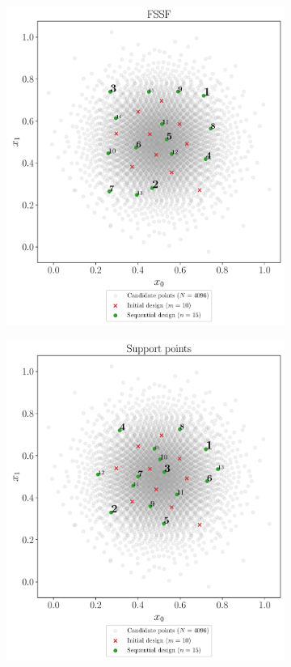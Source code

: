 \begin{figure}
  \centering
  \begin{subfigure}[b]{0.48\linewidth}
    \centering
    \includegraphics[width=\textwidth]{./part2/figures/SIS/normal2D_FSSF.pdf}
  \end{subfigure}
  \begin{subfigure}[b]{0.48\linewidth}
    \centering
    \includegraphics[width=\textwidth]{./part2/figures/SIS/normal2D_SP.pdf}

\end{subfigure}
\end{figure}

